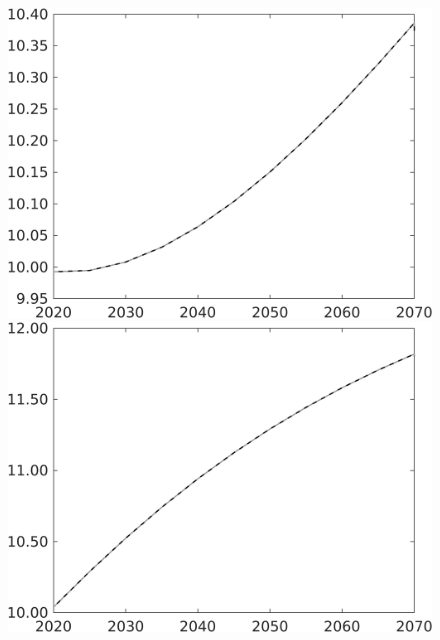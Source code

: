 \begin{figure}[h!!]
\begin{minipage}[]{0.32\textwidth}
\end{minipage}	
\begin{minipage}[]{0.32\textwidth}
\includegraphics[width=1\textwidth]{../../codding_model/own_basedOnFried/optimalPol_010922_revision/figures/all_13Sept22/CompTaul_Equlab_LFBAU_Reg0_gAf_spillover0_nsk1_xgr1_knspil0_sep1_countec0_GovRev0_etaa0.79_lgd0.png}
\end{minipage}	
\begin{minipage}[]{0.32\textwidth}
\includegraphics[width=1\textwidth]{../../codding_model/own_basedOnFried/optimalPol_010922_revision/figures/all_13Sept22/CompTaul_Equlab_LFBAU_Reg0_gAagg_spillover0_nsk1_xgr1_knspil0_sep1_countec0_GovRev0_etaa0.79_lgd0.png}

\end{minipage}
\end{figure}
